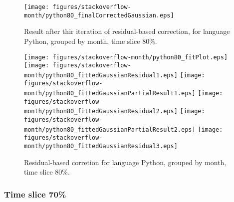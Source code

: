 \begin{figure}[]
\centering
{\texttt{[image: figures/stackoverflow-month/python80\_finalCorrectedGaussian.eps]}}
\caption{Result after thir iteration of residual-based correction, for language Python, grouped by month, time slice 80\%.}
\end{figure}


\begin{figure}[hb]
\centering
{}
{\texttt{[image: figures/stackoverflow-month/python80\_fitPlot.eps]}}
{\texttt{[image: figures/stackoverflow-month/python80\_fittedGaussianResidual1.eps]}}
{\texttt{[image: figures/stackoverflow-month/python80\_fittedGaussianPartialResult1.eps]}}
{\texttt{[image: figures/stackoverflow-month/python80\_fittedGaussianResidual2.eps]}}
{\texttt{[image: figures/stackoverflow-month/python80\_fittedGaussianPartialResult2.eps]}}
{\texttt{[image: figures/stackoverflow-month/python80\_fittedGaussianResidual3.eps]}}
\caption{Residual-based corretion for language Python, grouped by month, time slice 80\%.}
\end{figure}


\clearpage 
\newpage 


\FloatBarrier

\subsubsection{Time slice 70\%}

